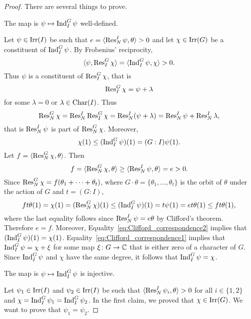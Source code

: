\begin{proof}
    There are several things to prove. 

    \begin{claim}
        The map is $\psi\mapsto\operatorname{Ind}_I^G\psi$ well-defined. 
    \end{claim}

    Let $\psi\in\operatorname{Irr}(I)$ be such that $e=\langle\operatorname{Res}_N^I\psi,\theta\rangle>0$ and 
    let $\chi\in\operatorname{Irr}(G)$ be a constituent of $\operatorname{Ind}_I^G\psi$. By Frobenius' reciprocity, 
    \begin{equation}
        \label{eq:Clifford_correspondence1}
        \langle\psi,\operatorname{Res}_I^G\chi\rangle=\langle\operatorname{Ind}_I^G\psi,\chi\rangle>0.
    \end{equation}
    Thus $\psi$ is a constituent of $\operatorname{Res}_I^G\chi$, that is 
    \[
    \operatorname{Res}_I^G\chi=\psi+\lambda 
    \]
    for some $\lambda=0$ or $\lambda\in\operatorname{Char}(I)$. Thus
    \[
    \operatorname{Res}_N^G\chi=\operatorname{Res}_N^I\operatorname{Res}_I^G\chi=\operatorname{Res}_N^I(\psi+\lambda)
    =\operatorname{Res}_N^I\psi+\operatorname{Res}_N^I\lambda, 
    \]
    that is 
    $\operatorname{Res}_N^I\psi$ is part of $\operatorname{Res}_N^G\chi$. 
    Moreover, 
    \[
    \chi(1)\leq(\operatorname{Ind}_I^G\psi)(1)=(G:I)\psi(1).
    \]
    Let $f=\langle\operatorname{Res}_N^G\chi,\theta\rangle$. Then  
    \[
    f=\langle\operatorname{Res}_N^G\chi,\theta\rangle
    \geq\langle\operatorname{Res}_N^I\psi,\theta\rangle=e>0.
    \]
    Since $\operatorname{Res}_N^G\chi=f(\theta_1+\cdots+\theta_t)$, where $G\cdot\theta=\{\theta_1,\dots,\theta_t\}$ is 
    the orbit of $\theta$ under the action of $G$ and $t=(G:I)$,  
    \begin{equation}
    \label{eq:Clifford_correspondence2}
    ft\theta(1)=\chi(1)=(\operatorname{Res}_N^G\chi)(1)\leq(\operatorname{Ind}_I^G\psi)(1)=t\psi(1)=et\theta(1)\leq ft\theta(1),
    \end{equation}
    where the last equality follows since 
    $\operatorname{Res}_N^I\psi=e\theta$ by Clifford's theorem. Therefore $e=f$. Moreover, 
    Equality~\eqref{eq:Clifford_correspondence2}
    implies that 
    $(\operatorname{Ind}_I^G\psi)(1)=\chi(1)$. Equality~\eqref{eq:Clifford_correspondence1}
    implies that $\operatorname{Ind}_I^G\psi=\chi+\xi$ for some map $\xi\colon G\to\mathbb{C}$ that is 
    either zero of a character of $G$. Since 
    $\operatorname{Ind}_I^G\psi$ and $\chi$ have the same degree, 
    it follows that $\operatorname{Ind}_I^G\psi=\chi$. 

    \begin{claim}
        The map is $\psi\mapsto\operatorname{Ind}_I^G\psi$ is injective. 
    \end{claim}

    Let $\psi_1\in\operatorname{Irr}(I)$ and $\psi_2\in\operatorname{Irr}(I)$ 
    be such that 
    $\langle\operatorname{Res}_N^I\psi_i,\theta\rangle>0$ for all $i\in\{1,2\}$ and 
    $\chi=\operatorname{Ind}_I^G\psi_1=\operatorname{Ind}_I^G\psi_2$. In the first claim, we proved that $\chi\in\operatorname{Irr}(G)$. 
    We want to prove that $\psi_1=\psi_2$. 
    

\end{proof}
